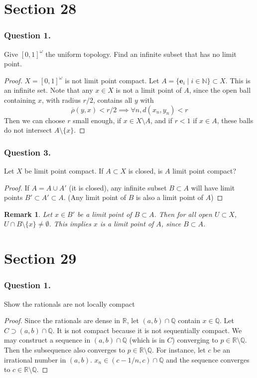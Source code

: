 \documentclass[12pt]{article}
\newtheorem{remark}{Remark}
\begin{document}
\section{Section 28}
\subsubsection*{Question 1.}
Give $[0, 1]^\omega$ the uniform topology.
Find an infinite subset that has no limit point.

\begin{proof}
    $X = [0, 1]^\omega$ is not limit point compact.
    Let $A = \{\mathbf{e}_i \mid i \in \mathbb{N}\} \subset X$.
    This is an infinite set. Note that any $x \in X$ is not a limit point of 
    $A$, since the open ball containing $x$, with radius $r/2$, contains all
    $y$ with
    $$\overline{\rho}(y, x) < r/2 \implies \forall n,  d(x_n, y_n) < r$$ 
    Then we can choose $r$ small enough, if $x \in X \setminus A$, and if $r < 1$ if $x \in A$,
    these balls do not intersect $A \setminus \{x\}$.
\end{proof}

\subsubsection*{Question 3.}
Let $X$ be limit point compact.
If $A \subset X$ is closed, is $A$ limit point compact?

\begin{proof}
    If $A = A \cup A'$ (it is closed), any infinite subset $B \subset A$
    will have limit points $B' \subset A' \subset A$.
    (Any limit point of $B$ is also a limit point of $A$)
\end{proof}
\begin{remark}
    Let $x \in B'$ be a limit point of $B \subset A$.
    Then for all open $U \subset X$, 
    $U \cap B \setminus \{x\} \ne \emptyset$. This implies 
    $x$ is a limit point of $A$, since $B \subset A$.
\end{remark}

\section{Section 29}
\subsubsection*{Question 1.} Show the rationals are not locally compact
\begin{proof}
    Since the rationals are dense in $\mathbb{R}$,
    let $(a, b) \cap \mathbb{Q}$ contain $x \in \mathbb{Q}$.
    Let $C \supset (a, b) \cap \mathbb{Q}$. It is not compact because 
    it is not sequentially compact. We may construct a sequence in 
    $(a, b) \cap \mathbb{Q}$ (which is in $C$) converging to 
    $p \in \mathbb{R}\setminus \mathbb{Q}$. Then the subsequence also converges 
    to $p \in \mathbb{R}\setminus \mathbb{Q}$. For instance, let $c$ be an 
    irrational number in $(a, b)$.
    $x_n \in (c - 1/n, c) \cap \mathbb{Q}$ and the sequence converges to $c \in \mathbb{R} 
    \setminus \mathbb{Q}$.

\end{proof}
\end{document}

